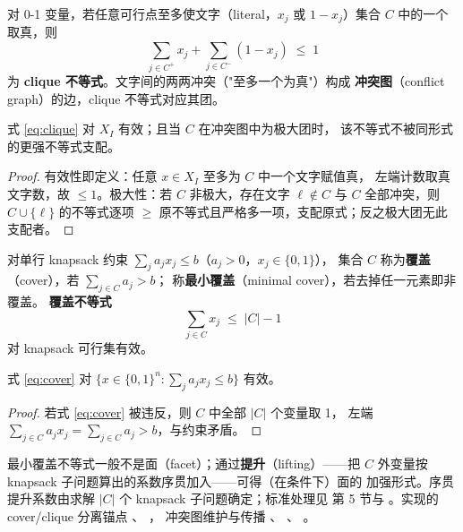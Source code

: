 \begin{definition}
对 0-1 变量，若任意可行点至多使文字（literal，$x_j$ 或 $1 - x_j$）集合
$C$ 中的一个取真，则
\begin{equation}
\label{eq:clique}
\sum_{j \in C^+} x_j + \sum_{j \in C^-} (1 - x_j) \;\le\; 1
\end{equation}
为 \textbf{clique 不等式}。文字间的两两冲突（"至多一个为真"）构成
\textbf{冲突图}（conflict graph）的边，clique 不等式对应其团。
\end{definition}

\begin{proposition}
式 \eqref{eq:clique} 对 $X_I$ 有效；且当 $C$ 在冲突图中为极大团时，
该不等式不被同形式的更强不等式支配。
\end{proposition}
\begin{proof}
有效性即定义：任意 $x \in X_I$ 至多为 $C$ 中一个文字赋值真，
左端计数取真文字数，故 $\le 1$。极大性：若 $C$ 非极大，存在文字
$\ell \notin C$ 与 $C$ 全部冲突，则 $C \cup \{\ell\}$ 的不等式逐项
$\ge$ 原不等式且严格多一项，支配原式；反之极大团无此支配者。
\end{proof}

\begin{definition}
对单行 knapsack 约束 $\sum_j a_j x_j \le b$（$a_j > 0$，$x_j \in \{0,1\}$），
集合 $C$ 称为\textbf{覆盖}（cover），若 $\sum_{j \in C} a_j > b$；
称\textbf{最小覆盖}（minimal cover），若去掉任一元素即非覆盖。
\textbf{覆盖不等式}
\begin{equation}
\label{eq:cover}
\sum_{j \in C} x_j \;\le\; |C| - 1
\end{equation}
对 knapsack 可行集有效。
\end{definition}

\begin{proposition}[覆盖不等式的有效性]
\label{prop:cover-validity}
式 \eqref{eq:cover} 对 $\{x \in \{0,1\}^n : \sum_j a_j x_j \le b\}$ 有效。
\end{proposition}
\begin{proof}
若式 \eqref{eq:cover} 被违反，则 $C$ 中全部 $|C|$ 个变量取 1，
左端 $\sum_{j \in C} a_j x_j = \sum_{j \in C} a_j > b$，与约束矛盾。
\end{proof}

\begin{remark}
最小覆盖不等式一般不是面（facet）；通过\textbf{提升}（lifting）——把
$C$ 外变量按 knapsack 子问题算出的系数序贯加入——可得（在条件下）面的
加强形式。序贯提升系数由求解 $|C|$ 个 knapsack 子问题确定；标准处理见
\cite{cornuejols2008} 第 5 节与 \cite{crowder1983}。实现的 cover/clique
分离锚点
、
，
冲突图维护与传播
、
、
。
\end{remark}

